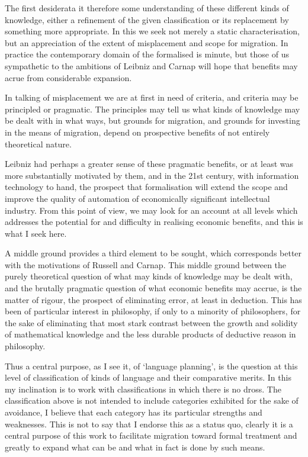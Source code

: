 \documentclass[numreferences]{rbjk}
\begin{document}
\begin{article}
The first desiderata it therefore some understanding of these different kinds of knowledge, either a refinement of the given classification or its replacement by something more appropriate.
In this we seek not merely a static characterisation, but an appreciation of the extent of misplacement and scope for migration.
In practice the contemporary domain of the formalised is minute, but those of us sympathetic to the ambitions of Leibniz and Carnap will hope that benefits may acrue from considerable expansion.

In talking of misplacement we are at first in need of criteria, and criteria may be principled or pragmatic.
The principles may tell us what kinds of knowledge may be dealt with in what ways, but grounds for migration, and grounds for investing in the means of migration, depend on prospective benefits of not entirely theoretical nature.

Leibniz had perhaps a greater sense of these pragmatic benefits, or at least was more substantially motivated by them, and in the 21st century, with information technology to hand, the prospect that formalisation will extend the scope and improve the quality of automation of economically significant intellectual industry.
From this point of view, we may look for an account at all levels which addresses the potential for and difficulty in realising economic benefits, and this is what I seek here.

A middle ground provides a third element to be sought, which corresponds better with the motivations of Russell and Carnap.
This middle ground between the purely theoretical question of what may kinds of knowledge may be dealt with, and the brutally pragmatic question of what economic benefits may accrue, is the matter of rigour, the prospect of eliminating error, at least in deduction.
This has been of particular interest in philosophy, if only to a minority of philosophers, for the sake of eliminating that most stark contrast between the growth and solidity of mathematical knowledge and the less durable products of deductive reason in philosophy.

Thus a central purpose, as I see it, of `language planning', is the question at this level of classification of kinds of language and their comparative merits.
In this my inclination is to work with classifications in which there is no dross.
The classification above is not intended to include categories exhibited for the sake of avoidance, I believe that each category has its particular strengths and weaknesses.
This is not to say that I endorse this as a status quo, clearly it is a central purpose of this work to facilitate migration toward formal treatment and greatly to expand what can be and what in fact is done by such means.


\end{article}
\end{document}
